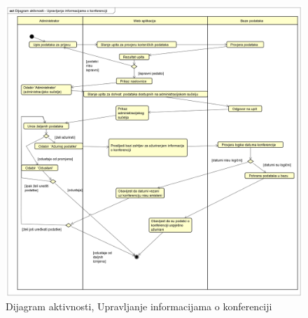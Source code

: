 			 \begin{figure}[H]
			 	\includegraphics[width= 15 cm, height= 25 cm, keepaspectratio]{dijagrami/Dijagram aktivnosti - Upravljanje informacijama o konferenciji.png} 
			 	\centering
			 	\caption{Dijagram aktivnosti, Upravljanje informacijama o konferenciji}
			 	\label{fig:act3}
			 \end{figure}
